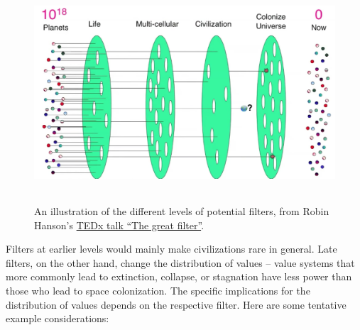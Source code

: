 \documentclass[]{article}
\begin{document}
\begin{figure}[h!]
    \centering
    \includegraphics[width=5.35625in,height=3.20307in]{figs/great-filter}
    \caption{An illustration of the different levels of
potential filters, from Robin Hanson's
\href{https://www.youtube.com/watch?v=aspMV6ERqpo}{TEDx talk ``The
great filter''}.}
    \label{great-filter}
\end{figure}

Filters at earlier levels would mainly make civilizations rare in
general. Late filters, on the other hand, change the distribution of
values -- value systems that more commonly lead to extinction, collapse,
or stagnation have less power than those who lead to space colonization.
The specific implications for the distribution of values depends on the
respective filter. Here are some tentative example considerations:
\end{document}
